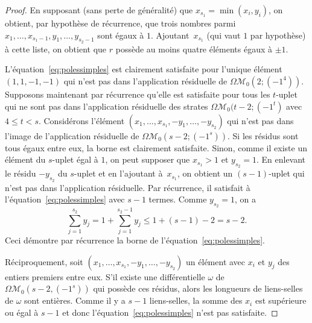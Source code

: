 \documentclass[JEP,XML,SOM,Unicode,francais,NoFloatCountersInSection,published]{cedram}
\let\mathcal\mathscr
\newcommand{\omoduli}[1][g]{{\Omega\mathcal M}_{\!#1}}
\theoremstyle{definition}
\begin{document}
\begin{proof}
En supposant (sans perte de généralité) que $x_{s_{1}}=\min(x_{i},y_{i})$, on obtient, par hypothèse de récurrence, que trois nombres parmi $x_{1},\dots,x_{s_{1}-1},y_{1},\dots,y_{s_{2}-1}$ sont égaux à $1$. Ajoutant~$x_{s_{1}}$ (qui vaut $1$ par hypothèse) à cette liste, on obtient que $r$ possède au moins quatre éléments égaux à $\pm 1$.

L'équation~\eqref{eq:polessimples} est clairement satisfaite pour l'unique élément $(1,1,-1,-1)$ qui n'est pas dans l'application résiduelle de $\omoduli[0](2;(-1^{4}))$. Supposons maintenant par récurrence qu'elle est satisfaite pour tous les $t$-uplet qui ne sont pas dans l'application résiduelle des strates $\omoduli[0](t-2;(-1^{t})$ avec $4 \leq t<s$. Considérons l'élément $(x_{1},\dots,x_{s_{1}},-y_{1},\dots,-y_{s_{2}})$ qui n'est pas dans l'image de l'application résiduelle de $\omoduli[0](s-2;(-1^{s}))$.
Si les résidus sont tous égaux entre eux, la borne est clairement satisfaite. Sinon, comme il existe un élément du $s$-uplet égal à $1$, on peut supposer que $x_{s_{1}}>1$ et $y_{s_{2}}=1$. En enlevant le résidu $-y_{s_{2}}$ du $s$-uplet et en l'ajoutant à~$x_{s_{1}}$, on obtient un $(s-1)$-uplet qui n'est pas dans l'application résiduelle. Par récurrence, il satisfait à l'équation~\eqref{eq:polessimples} avec $s-1$ termes. Comme $y_{s_{2}} = 1$, on a\vspace*{-3pt}
\[
\sum_{j=1}^{s_{2}} y_{j} = 1 + \sum_{j=1}^{s_{2}-1} y_{j} \leq 1 + (s-1)-2 = s-2.\]
Ceci démontre par récurrence la borne de l'équation~\eqref{eq:polessimples}.

Réciproquement, soit $(x_{1},\dots,x_{s_{1}},-y_{1},\dots,-y_{s_{2}})$ un élément avec $x_{i}$ et $y_{j}$ des entiers premiers entre eux. S'il existe une différentielle $\omega$ de $\omoduli[0](s-2,(-1^{s}))$ qui possède ces résidus, alors les longueurs de liens-selles de $\omega$ sont entières. Comme il y a $s-1$ liens-selles, la somme des $x_{i}$ est supérieure ou égal à $s-1$ et donc l'équation~\eqref{eq:polessimples} n'est pas satisfaite.
\end{proof}
\end{document}
